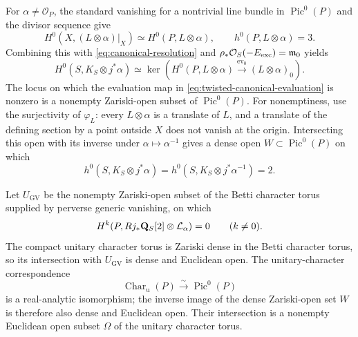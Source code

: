 For $\alpha\ne\mathcal O_P$, the standard vanishing for a nontrivial
line bundle in $\operatorname{Pic}^0(P)$ and the divisor sequence give
\[
 H^0(X,(L\otimes\alpha)|_X)\simeq H^0(P,L\otimes\alpha),
 \qquad h^0(P,L\otimes\alpha)=3.
\]
Combining this with \eqref{eq:canonical-resolution} and
$\rho_*\mathcal O_S(-E_{\mathrm{exc}})=\mathfrak m_0$ yields
\begin{equation}
 H^0(S,K_S\otimes j^*\alpha)
 \simeq
 \ker\!\left(
 H^0(P,L\otimes\alpha)\xrightarrow{\operatorname{ev}_0}
 (L\otimes\alpha)_0\right).
\label{eq:twisted-canonical-evaluation}
\end{equation}
The locus on which the evaluation map in
\eqref{eq:twisted-canonical-evaluation} is nonzero is a nonempty Zariski-open
subset of $\operatorname{Pic}^0(P)$.  For nonemptiness, use the
surjectivity of $\varphi_L$: every $L\otimes\alpha$ is a translate of $L$,
and a translate of the defining section by a point outside $X$ does not
vanish at the origin.  Intersecting this open with its inverse under
$\alpha\mapsto\alpha^{-1}$ gives a dense open $W\subset\operatorname{Pic}^0(P)$
on which
\begin{equation}
 h^0(S,K_S\otimes j^*\alpha)
 =h^0(S,K_S\otimes j^*\alpha^{-1})=2.
\label{eq:twisted-outer-hodge}
\end{equation}

Let $U_{\mathrm{GV}}$ be the nonempty Zariski-open subset of the Betti
character torus supplied by perverse generic vanishing, on which
\[
 H^k(P,Rj_*\mathbf Q_S[2]\otimes\mathcal L_\alpha)=0\qquad(k\ne0).
\]
The compact unitary character torus is Zariski dense in the Betti character
torus, so its intersection with $U_{\mathrm{GV}}$ is dense and Euclidean
open.  The unitary-character correspondence
\[
 \operatorname{Char}_{\mathrm u}(P)\xrightarrow{\sim}
 \operatorname{Pic}^0(P)
\]
is a real-analytic isomorphism; the inverse image of the dense Zariski-open
set $W$ is therefore also dense and Euclidean open.  Their intersection is a
nonempty Euclidean open subset $\Omega$ of the unitary character torus.


